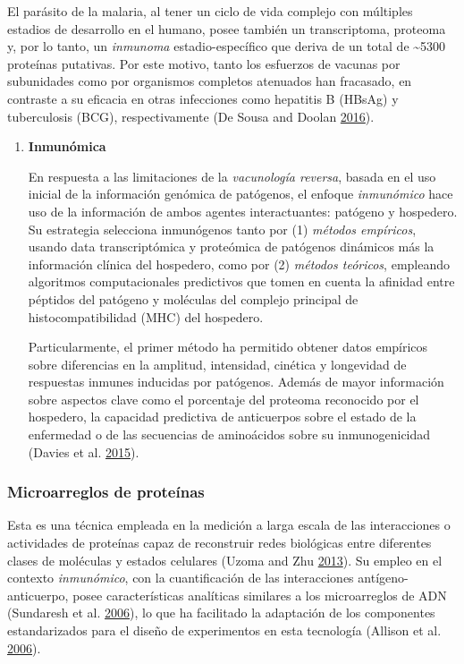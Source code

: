 \documentclass[
  a4paper]{article}
\begin{document}
\begin{enumerate}
  El parásito de la malaria, al tener un ciclo de vida complejo con
  múltiples estadios de desarrollo en el humano, posee también un
  transcriptoma, proteoma y, por lo tanto, un \emph{inmunoma}
  estadio-específico que deriva de un total de \textasciitilde{}5300
  proteínas putativas. Por este motivo, tanto los esfuerzos de vacunas
  por subunidades como por organismos completos atenuados han fracasado,
  en contraste a su eficacia en otras infecciones como hepatitis B
  (HBsAg) y tuberculosis (BCG), respectivamente (De Sousa and Doolan
  \protect\hyperlink{ref-immunomics2016}{2016}).

  \begin{enumerate}
  \def\labelenumii{\roman{enumii}.}
  \item
    \textbf{Inmunómica}

    En respuesta a las limitaciones de la \emph{vacunología reversa},
    basada en el uso inicial de la información genómica de patógenos, el
    enfoque \emph{inmunómico} hace uso de la información de ambos
    agentes interactuantes: patógeno y hospedero. Su estrategia
    selecciona inmunógenos tanto por (1) \emph{métodos empíricos},
    usando data transcriptómica y proteómica de patógenos dinámicos más
    la información clínica del hospedero, como por (2) \emph{métodos
    teóricos}, empleando algoritmos computacionales predictivos que
    tomen en cuenta la afinidad entre péptidos del patógeno y moléculas
    del complejo principal de histocompatibilidad (MHC) del hospedero.

    Particularmente, el primer método ha permitido obtener datos
    empíricos sobre diferencias en la amplitud, intensidad, cinética y
    longevidad de respuestas inmunes inducidas por patógenos. Además de
    mayor información sobre aspectos clave como el porcentaje del
    proteoma reconocido por el hospedero, la capacidad predictiva de
    anticuerpos sobre el estado de la enfermedad o de las secuencias de
    aminoácidos sobre su inmunogenicidad (Davies et al.
    \protect\hyperlink{ref-Davies2015Large}{2015}). 
  \end{enumerate}
\end{enumerate}

\hypertarget{microarreglos-de-proteuxednas}{%
\subsubsection{Microarreglos de
proteínas}\label{microarreglos-de-proteuxednas}}

Esta es una técnica empleada en la medición a larga escala de las
interacciones o actividades de proteínas capaz de reconstruir redes
biológicas entre diferentes clases de moléculas y estados celulares
(Uzoma and Zhu \protect\hyperlink{ref-uzoma2013interactome}{2013}). Su
empleo en el contexto \emph{inmunómico}, con la cuantificación de las
interacciones antígeno-anticuerpo, posee características analíticas
similares a los microarreglos de ADN (Sundaresh et al.
\protect\hyperlink{ref-sundaresh2006}{2006}), lo que ha facilitado la
adaptación de los componentes estandarizados para el diseño de
experimentos en esta tecnología (Allison et al.
\protect\hyperlink{ref-allison2006}{2006}).
\end{document}
